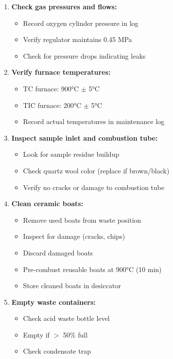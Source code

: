 \documentclass[11pt,a4paper]{article}\usepackage[]{graphicx}\usepackage[]{xcolor}
\begin{document}
\begin{enumerate}[noitemsep]
    \item \textbf{Check gas pressures and flows:}
    \begin{itemize}
        \item Record oxygen cylinder pressure in log
        \item Verify regulator maintains 0.45 MPa
        \item Check for pressure drops indicating leaks
    \end{itemize}
    \item \textbf{Verify furnace temperatures:}
    \begin{itemize}
        \item TC furnace: 900°C $\pm$ 5°C
        \item TIC furnace: 200°C $\pm$ 5°C
        \item Record actual temperatures in maintenance log
    \end{itemize}
    \item \textbf{Inspect sample inlet and combustion tube:}
    \begin{itemize}
        \item Look for sample residue buildup
        \item Check quartz wool color (replace if brown/black)
        \item Verify no cracks or damage to combustion tube
    \end{itemize}
    \item \textbf{Clean ceramic boats:}
    \begin{itemize}
        \item Remove used boats from waste position
        \item Inspect for damage (cracks, chips)
        \item Discard damaged boats
        \item Pre-combust reusable boats at 900°C (10 min)
        \item Store cleaned boats in desiccator
    \end{itemize}
    \item \textbf{Empty waste containers:}
    \begin{itemize}
        \item Check acid waste bottle level
        \item Empty if $>$ 50\% full
        \item Check condensate trap
    \end{itemize}

\end{enumerate}
\end{document}

